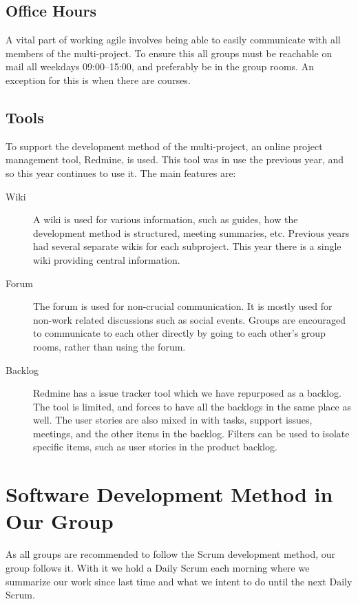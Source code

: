 \subsection{Office Hours}
A vital part of working agile involves being able to easily communicate with all members of the multi-project. To ensure this all groups must be reachable on mail all weekdays 09:00--15:00, and preferably be in the group rooms. An exception for this is when there are courses.

\subsection{Tools}\label{sec:tools}
To support the development method of the multi-project, an online project management tool, Redmine\parencite{redmine-website}, is used. This tool was in use the previous year, and so this year continues to use it. The main features are:

\begin{description}
  \item[Wiki] A wiki is used for various information, such as guides, how the development method is structured, meeting summaries, etc. Previous years had several separate wikis for each subproject. This year there is a single wiki providing central information.
  \item[Forum] The forum is used for non-crucial communication. It is mostly used for non-work related discussions such as social events. Groups are encouraged to communicate to each other directly by going to each other's group rooms, rather than using the forum.
  \item[Backlog] Redmine has a issue tracker tool which we have repurposed as a backlog. The tool is limited, and forces to have all the backlogs in the same place as well. The user stories are also mixed in with tasks, support issues, meetings, and the other items in the backlog. Filters can be used to isolate specific items, such as user stories in the product backlog.
\end{description}

\section{Software Development Method in Our Group}\label{sec:swmethod_ourgroup}
As all groups are recommended to follow the Scrum development method, our group follows it. With it we hold a Daily Scrum each morning where we summarize our work since last time and what we intent to do until the next Daily Scrum.

